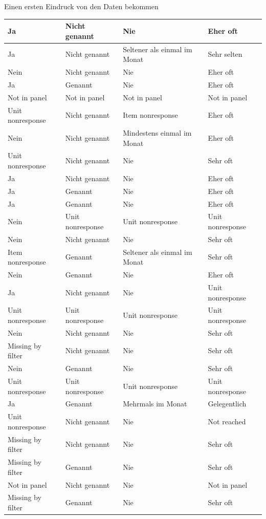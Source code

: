 \documentclass[ignorenonframetext,]{beamer}
\begin{document}
\begin{frame}{Einen ersten Eindruck von den Daten bekommen}
\begin{tabular}{l|l|l|l}
\hline
Ja & Nicht genannt & Nie & Eher oft\\
\hline
Ja & Nicht genannt & Seltener als einmal im Monat & Sehr selten\\
\hline
Nein & Nicht genannt & Nie & Eher oft\\
\hline
Ja & Genannt & Nie & Eher oft\\
\hline
Not in panel & Not in panel & Not in panel & Not in panel\\
\hline
Unit nonresponse & Nicht genannt & Item nonresponse & Eher oft\\
\hline
Nein & Nicht genannt & Mindestens einmal im Monat & Eher oft\\
\hline
Unit nonresponse & Nicht genannt & Nie & Sehr oft\\
\hline
Ja & Nicht genannt & Nie & Eher oft\\
\hline
Ja & Genannt & Nie & Eher oft\\
\hline
Ja & Genannt & Nie & Eher oft\\
\hline
Nein & Unit nonresponse & Unit nonresponse & Unit nonresponse\\
\hline
Nein & Nicht genannt & Nie & Sehr oft\\
\hline
Item nonresponse & Genannt & Seltener als einmal im Monat & Sehr oft\\
\hline
Nein & Genannt & Nie & Eher oft\\
\hline
Ja & Nicht genannt & Nie & Unit nonresponse\\
\hline
Unit nonresponse & Unit nonresponse & Unit nonresponse & Unit nonresponse\\
\hline
Nein & Nicht genannt & Nie & Sehr oft\\
\hline
Missing by filter & Nicht genannt & Nie & Sehr oft\\
\hline
Nein & Genannt & Nie & Sehr oft\\
\hline
Unit nonresponse & Unit nonresponse & Unit nonresponse & Unit nonresponse\\
\hline
Ja & Genannt & Mehrmals im Monat & Gelegentlich\\
\hline
Unit nonresponse & Nicht genannt & Nie & Not reached\\
\hline
Missing by filter & Nicht genannt & Nie & Sehr oft\\
\hline
Missing by filter & Genannt & Nie & Sehr oft\\
\hline
Not in panel & Nicht genannt & Nie & Not in panel\\
\hline
Missing by filter & Genannt & Nie & Sehr oft\\

\end{tabular}
\end{frame}
\end{document}
